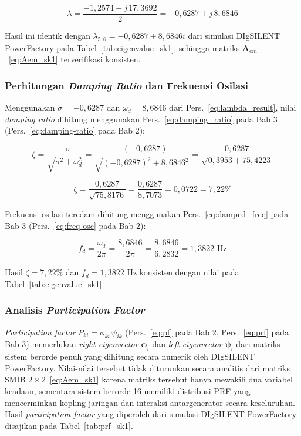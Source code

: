 \begin{equation}
    \lambda = \frac{-1{,}2574 \pm j\,17{,}3692}{2} = -0{,}6287 \pm j\,8{,}6846
    \label{eq:lambda_result}
\end{equation}

Hasil ini identik dengan $\lambda_{5,6} = -0{,}6287 \pm 8{,}6846i$ dari simulasi
DIgSILENT PowerFactory pada Tabel~\ref{tab:eigenvalue_sk1}, sehingga matriks
$\mathbf{A}_{em}$~\eqref{eq:Aem_sk1} terverifikasi konsisten.

\subsubsection{Perhitungan \textit{Damping Ratio} dan Frekuensi Osilasi}

Menggunakan $\sigma = -0{,}6287$ dan $\omega_d = 8{,}6846$ dari
Pers.~\eqref{eq:lambda_result}, nilai \textit{damping ratio} dihitung menggunakan
Pers.~\ref{eq:damping_ratio} pada Bab 3 (Pers.~\ref{eq:damping-ratio} pada
Bab 2):

\begin{equation}
    \zeta = \frac{-\sigma}{\sqrt{\sigma^2 + \omega_d^2}}
           = \frac{-(-0{,}6287)}{\sqrt{(-0{,}6287)^2 + 8{,}6846^2}}
           = \frac{0{,}6287}{\sqrt{0{,}3953 + 75{,}4223}}
    \label{eq:dr_calc_1}
\end{equation}

\begin{equation}
    \zeta = \frac{0{,}6287}{\sqrt{75{,}8176}} = \frac{0{,}6287}{8{,}7073}
           = 0{,}0722 = 7{,}22\%
    \label{eq:dr_calc_2}
\end{equation}

Frekuensi osilasi teredam dihitung menggunakan Pers.~\ref{eq:damped_freq} pada
Bab 3 (Pers.~\ref{eq:freq-osc} pada Bab 2):

\begin{equation}
    f_d = \frac{\omega_d}{2\pi} = \frac{8{,}6846}{2\pi}
        = \frac{8{,}6846}{6{,}2832} = 1{,}3822 \text{ Hz}
    \label{eq:fd_calc}
\end{equation}

Hasil $\zeta = 7{,}22\%$ dan $f_d = 1{,}3822$ Hz konsisten dengan nilai pada
Tabel~\ref{tab:eigenvalue_sk1}.

\subsubsection{Analisis \textit{Participation Factor}}

\textit{Participation factor} $P_{ki} = \phi_{ki}\,\psi_{ik}$
(Pers.~\ref{eq:pf} pada Bab 2, Pers.~\ref{eq:prf} pada Bab 3) memerlukan
\textit{right eigenvector} $\boldsymbol{\phi}_i$ dan \textit{left eigenvector}
$\boldsymbol{\psi}_i$ dari matriks sistem berorde penuh yang dihitung secara
numerik oleh DIgSILENT PowerFactory. Nilai-nilai tersebut tidak diturunkan
secara analitis dari matriks SMIB $2\times2$~\eqref{eq:Aem_sk1} karena matriks
tersebut hanya mewakili dua variabel keadaan, sementara sistem berorde 16
memiliki distribusi PRF yang mencerminkan kopling jaringan dan interaksi
antargenerator secara keseluruhan. Hasil \textit{participation factor} yang
diperoleh dari simulasi DIgSILENT PowerFactory disajikan pada
Tabel~\ref{tab:prf_sk1}.

